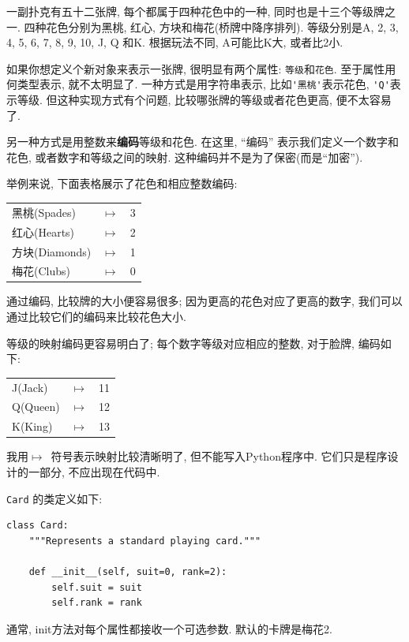 \documentclass[10pt]{book}
\begin{document}
一副扑克有五十二张牌, 每个都属于四种花色中的一种, 同时也是十三个等级牌之一. 
四种花色分别为黑桃, 红心, 方块和梅花(桥牌中降序排列). 
等级分别是A, 2, 3, 4, 5, 6, 7, 8, 9, 10, J, Q 和K. 根据玩法不同, 
A可能比K大, 或者比2小. 

如果你想定义个新对象来表示一张牌, 
很明显有两个属性: {\tt 等级}和{\tt 花色}.
至于属性用何类型表示, 就不太明显了. 
一种方式是用字符串表示, 比如\verb"'黑桃'"表示花色, 
\verb"'Q'"表示等级. 
但这种实现方式有个问题, 比较哪张牌的等级或者花色更高, 便不太容易了. 

另一种方式是用整数来{\bf 编码}等级和花色. 
在这里, ``编码'' 表示我们定义一个数字和花色, 或者数字和等级之间的映射. 
这种编码并不是为了保密(而是``加密''). 

\newcommand{\mymapsto}{$\mapsto$}

举例来说, 下面表格展示了花色和相应整数编码:

\begin{tabular}{l c l}
黑桃(Spades) & \mymapsto & 3 \\
红心(Hearts) & \mymapsto & 2 \\
方块(Diamonds) & \mymapsto & 1 \\
梅花(Clubs) & \mymapsto & 0
\end{tabular}

通过编码, 比较牌的大小便容易很多;
因为更高的花色对应了更高的数字, 我们可以通过比较它们的编码来比较花色大小. 

等级的映射编码更容易明白了; 
每个数字等级对应相应的整数, 对于脸牌, 编码如下:

\begin{tabular}{l c l}
J(Jack) & \mymapsto & 11 \\
Q(Queen) & \mymapsto & 12 \\
K(King) & \mymapsto & 13 \\
\end{tabular}

我用\mymapsto~符号表示映射比较清晰明了, 但不能写入Python程序中. 
它们只是程序设计的一部分, 不应出现在代码中. 

{\tt Card} 的类定义如下:

\begin{verbatim}
class Card:
    """Represents a standard playing card."""

    def __init__(self, suit=0, rank=2):
        self.suit = suit
        self.rank = rank
\end{verbatim}
%
通常, init方法对每个属性都接收一个可选参数. 
默认的卡牌是梅花2.
\end{document}
